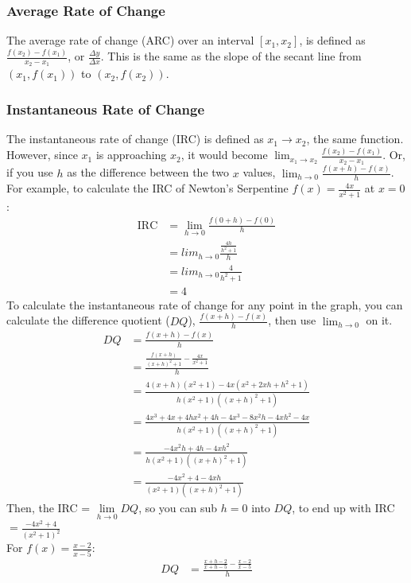 \documentclass{article}
\begin{document}
	\subsubsection{Average Rate of Change}
	The average rate of change (ARC) over an interval $[x_1, x_2]$, is defined as $\frac{f(x_2)-f(x_1)}{x_2-x_1}$, or $\frac{\Delta y}{\Delta x}$. This is the same as the slope of the secant line from $(x_1, f(x_1))$ to $(x_2, f(x_2))$.
	\subsubsection{Instantaneous Rate of Change}
	The instantaneous rate of change (IRC) is defined as $x_1\rightarrow x_2$, the same function. However, since $x_1$ is approaching $x_2$, it would become $\lim_{x_1\to x_2}\frac{f(x_2)-f(x_1)}{x_2-x_1}$. Or, if you use $h$ as the difference between the two $x$ values, $\lim_{h\to 0}\frac{f(x+h)-f(x)}{h}$. \\
	For example, to calculate the IRC of Newton's Serpentine $f(x)=\frac{4x}{x^2+1}$ at $x=0$:
	\begin{align*}
		\text{IRC}&=\lim_{h\to 0}\frac{f(0+h)-f(0)}{h}\\
		&=lim_{h\to 0}\frac{\frac{4h}{h^2+1}}{h}\\
		&=lim_{h\to 0}\frac{4}{h^2+1}\\
		&=4
	\end{align*}
	To calculate the instantaneous rate of change for any point in the graph, you can calculate the difference quotient ($DQ$), $\frac{f(x+h)-f(x)}{h}$, then use $\lim_{h\to 0}$ on it.
	\begin{align*}
		DQ&=\frac{f(x+h)-f(x)}{h}\\
		&=\frac{\frac{f(x+h)}{(x+h)^2+1}-\frac{4x}{x^2+1}}{h}\\
		&=\frac{4(x+h)(x^2+1)-4x(x^2+2xh+h^2+1)}{h(x^2+1)\left((x+h)^2+1\right)}\\
		&=\frac{4x^3+4x+4hx^2+4h-4x^3-8x^2h-4xh^2-4x}{h(x^2+1)\left((x+h)^2+1\right)}\\
		&=\frac{-4x^2h+4h-4xh^2}{h(x^2+1)\left((x+h)^2+1\right)}\\
		&=\frac{-4x^2+4-4xh}{(x^2+1)\left((x+h)^2+1\right)}
	\end{align*}
	Then, the IRC = $\lim\limits_{h\to 0}DQ$, so you can sub $h=0$ into $DQ$, to end up with IRC $=\frac{-4x^2+4}{(x^2+1)^2}$\\
	For $f(x)=\frac{x-2}{x-5}$:\\
	\begin{align*}
		DQ&=\frac{\frac{x+h-2}{x+h-5}-\frac{x-2}{x-5}}{h}
	\end{align*}
\end{document}
